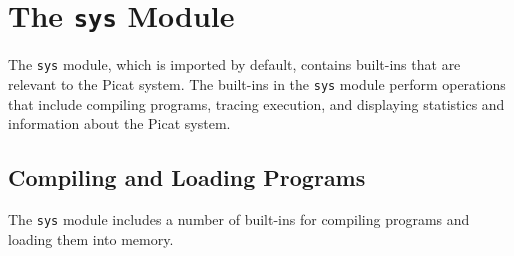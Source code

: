 
\chapter{The \texttt{sys} Module}\label{chapter:sys}
The \texttt{sys} module, which is imported by default, contains built-ins that are relevant to the Picat system.  The built-ins in the \texttt{sys} module perform operations that include compiling programs, tracing execution, and displaying statistics and information about the Picat system.   

\section{Compiling and Loading Programs}
The \texttt{sys} module includes a number of built-ins for compiling programs and loading them into memory.
